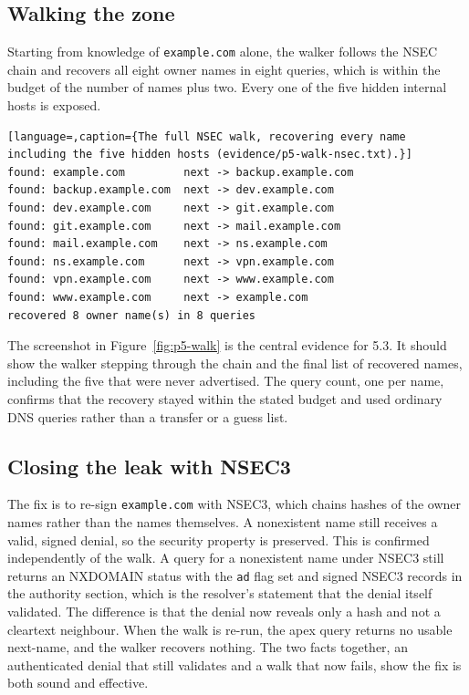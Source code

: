 \documentclass[11pt]{article}
\begin{document}
\subsection{Walking the zone}

Starting from knowledge of \texttt{example.com} alone, the walker follows the NSEC
chain and recovers all eight owner names in eight queries, which is within the
budget of the number of names plus two. Every one of the five hidden internal
hosts is exposed.

\begin{lstlisting}[language=,caption={The full NSEC walk, recovering every name including the five hidden hosts (evidence/p5-walk-nsec.txt).}]
found: example.com         next -> backup.example.com
found: backup.example.com  next -> dev.example.com
found: dev.example.com     next -> git.example.com
found: git.example.com     next -> mail.example.com
found: mail.example.com    next -> ns.example.com
found: ns.example.com      next -> vpn.example.com
found: vpn.example.com     next -> www.example.com
found: www.example.com     next -> example.com
recovered 8 owner name(s) in 8 queries
\end{lstlisting}


The screenshot in Figure~\ref{fig:p5-walk} is the central evidence for 5.3. It
should show the walker stepping through the chain and the final list of recovered
names, including the five that were never advertised. The query count, one per
name, confirms that the recovery stayed within the stated budget and used ordinary
DNS queries rather than a transfer or a guess list.

\subsection{Closing the leak with NSEC3}

The fix is to re-sign \texttt{example.com} with NSEC3, which chains hashes of the
owner names rather than the names themselves. A nonexistent name still receives a
valid, signed denial, so the security property is preserved. This is confirmed
independently of the walk. A query for a nonexistent name under NSEC3 still returns
an NXDOMAIN status with the \texttt{ad} flag set and signed NSEC3 records in the
authority section, which is the resolver's statement that the denial itself
validated. The difference is that the denial now reveals only a hash and not a
cleartext neighbour. When the walk is re-run, the apex query returns no usable
next-name, and the walker recovers nothing. The two facts together, an authenticated
denial that still validates and a walk that now fails, show the fix is both sound and
effective.
\end{document}
